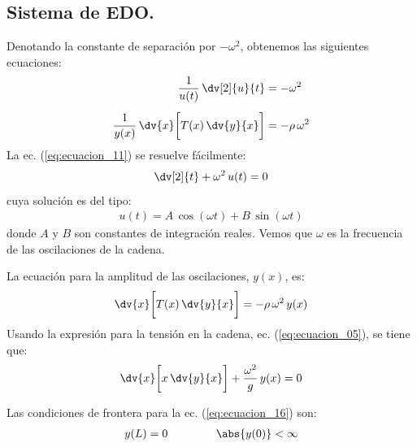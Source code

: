 \subsection{Sistema de EDO.}

Denotando la constante de separación por $- \omega^{2}$, obtenemos las siguientes ecuaciones:
\begin{align}
\dfrac{1}{u (t)} \, \dv[2]{u}{t} &= - \omega^{2} \label{eq:ecuacion_11} \\[0.5em]
\dfrac{1}{y (x)} \, \dv{x} \bigg[ T (x) \, \dv{y}{x} \bigg] &= - \rho \, \omega^{2} \label{eq:ecuacion_12}
\end{align}
La ec. (\ref{eq:ecuacion_11}) se resuelve fácilmente:
\begin{align}
\dv[2]{t} + \omega^{2} \, u (t) = 0
\label{eq:ecuacion_13}
\end{align}
cuya solución es del tipo:
\begin{align}
u (t) = A \, \cos (\omega t) + B \, \sin (\omega t)
\label{eq:ecuacion_14}
\end{align}
donde $A$ y $B$ son constantes de integración reales. Vemos que $\omega$ es la frecuencia de las oscilaciones de la cadena.
\par
La ecuación para la amplitud de las oscilaciones, $y (x)$, es:
\begin{align}
\dv{x} \bigg[ T (x) \, \dv{y}{x} \bigg] = - \rho \, \omega^{2} \, y (x)
\label{eq:ecuacion_15}
\end{align}
Usando la expresión para la tensión en la cadena, ec. (\ref{eq:ecuacion_05}), se tiene que:
\begin{align}
\dv{x} \bigg[ x \, \dv{y}{x} \bigg] + \dfrac{\omega^{2}}{g} \, y(x) = 0
\label{eq:ecuacion_16}
\end{align}

Las condiciones de frontera para la ec. (\ref{eq:ecuacion_16}) son:
\begin{align}
y (L) = 0 \hspace{1.5cm} \abs{y (0)} < \infty
\label{eq:ecuacion_17}
\end{align}

